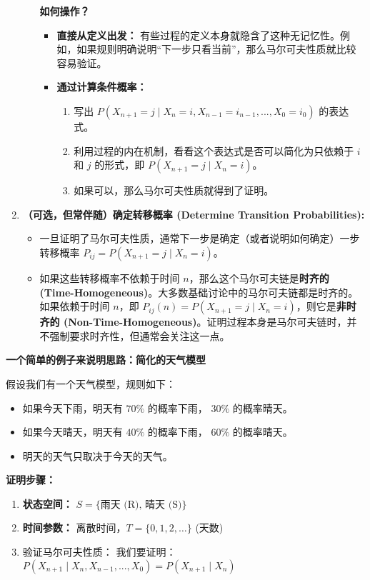 \begin{enumerate}
\begin{enumerate}
\begin{itemize}
		\end{itemize}
\textbf{如何操作？}
		\begin{itemize}
			\item \textbf{直接从定义出发：} 有些过程的定义本身就隐含了这种无记忆性。例如，如果规则明确说明“下一步只看当前”，那么马尔可夫性质就比较容易验证。
			\item \textbf{通过计算条件概率：}
			\begin{enumerate}
				\item 写出 $P(X_{n+1}=j \mid X_n=i, X_{n-1}=i_{n-1},...,X_0=i_0)$ 的表达式。
				\item 利用过程的内在机制，看看这个表达式是否可以简化为只依赖于 $i$ 和 $j$ 的形式，即 $P(X_{n+1}=j \mid X_n=i)$。
				\item 如果可以，那么马尔可夫性质就得到了证明。
			\end{enumerate}
		\end{itemize}
	\end{enumerate}
	\item \textbf{（可选，但常伴随）确定转移概率 (Determine Transition Probabilities):}
	\begin{itemize}
		\item 一旦证明了马尔可夫性质，通常下一步是确定（或者说明如何确定）一步转移概率 $P_{ij}=P(X_{n+1}=j \mid X_n=i)$。
		\item 如果这些转移概率不依赖于时间 $n$，那么这个马尔可夫链是\textbf{时齐的 (Time-Homogeneous)}。大多数基础讨论中的马尔可夫链都是时齐的。如果依赖于时间 $n$，即 $P_{ij}(n)=P(X_{n+1}=j \mid X_n=i)$，则它是\textbf{非时齐的 (Non-Time-Homogeneous)}。证明过程本身是马尔可夫链时，并不强制要求时齐性，但通常会关注这一点。
	\end{itemize}
\end{enumerate}

\textbf{一个简单的例子来说明思路：简化的天气模型}

假设我们有一个天气模型，规则如下：

\begin{itemize}
	\item 如果今天下雨，明天有 $70\%$ 的概率下雨， $30\%$ 的概率晴天。
	\item 如果今天晴天，明天有 $40\%$ 的概率下雨， $60\%$ 的概率晴天。
	\item 明天的天气只取决于今天的天气。
\end{itemize}

\textbf{证明步骤：}

\begin{enumerate}
	\item \textbf{状态空间：} $S=\{ \text{雨天 (R), 晴天 (S)} \}$
	\item \textbf{时间参数：} 离散时间，$T=\{ 0,1,2,\dots \}$ (天数)
	\item 验证马尔可夫性质：
我们要证明：$P(X_{n+1} \mid X_n, X_{n-1},...,X_0) = P(X_{n+1} \mid X_n)$
\end{enumerate}

